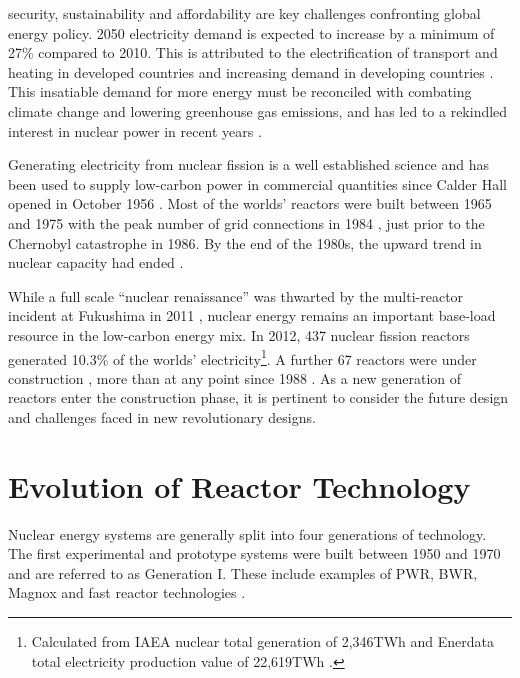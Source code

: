 \documentclass[journal]{IEEEtran}
\begin{document}
 security, sustainability and affordability are key challenges confronting global energy policy. 
2050 electricity demand is expected to increase by a minimum of 27\% compared to 2010. 
This is attributed to the electrification of transport and heating in developed countries and increasing demand in developing countries \cite{Kim201}.
This insatiable demand for more energy must be reconciled with combating climate change and lowering greenhouse gas emissions, and has led to a rekindled interest in nuclear power in recent years \cite{schneider2012nuclear}.

Generating electricity from nuclear fission is a well established science and has been used to supply low-carbon power in commercial quantities since Calder Hall opened in October 1956 \cite{NDA2007}.
Most of the worlds' reactors were built between 1965 and 1975 with the peak number of grid connections in 1984 \cite{Guidolin20121746,schneider2012nuclear}, just prior to the Chernobyl catastrophe in 1986.
By the end of the 1980s, the upward trend in nuclear capacity had ended \cite{schneider2012nuclear}.

While a full scale ``nuclear renaissance'' was thwarted by the multi-reactor incident at Fukushima in 2011 \cite{Guidolin20121746}, nuclear energy remains an important base-load resource in the low-carbon energy mix. 
In 2012, 437 nuclear fission reactors generated 10.3\% of the worlds' electricity\footnote{Calculated from IAEA nuclear total generation \cite{IAEAReactors2013} of 2,346TWh and Enerdata total electricity production value of 22,619TWh \cite{Enerdata}.}. 
A further 67 reactors were under construction \cite{IAEAReactors2013}, more than at any point since 1988 \cite{schneider2012nuclear}.
As a new generation of reactors enter the construction phase, it is pertinent to consider the future design and challenges faced in new revolutionary designs.

\section{Evolution of Reactor Technology}
Nuclear energy systems are generally split into four generations of technology. 
The first experimental and prototype systems were built between 1950 and 1970 \cite{GenIVRoadmap} and are referred to as Generation I.
These include examples of PWR, BWR, Magnox and fast reactor technologies \cite{goldberg2011nuclear}\cite{Bhatnagar2011}. 
\end{document}
